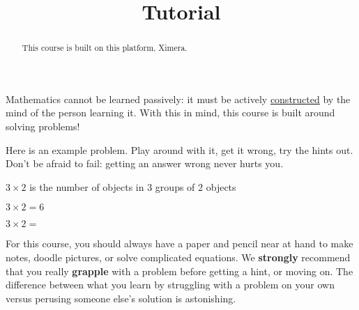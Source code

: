 \documentclass{ximera}
\title{Tutorial}
\begin{document}
\begin{abstract}
  This course is built on this platform, Ximera.
\end{abstract}\maketitle

Mathematics cannot be learned passively: it must be actively
\href{http://en.wikipedia.org/wiki/Constructivism_(philosophy_of_education)}{constructed}
by the mind of the person learning it.  With this in mind, this course
is built around solving problems!

Here is an example problem.  Play around with it, get it wrong, try
the hints out.  Don't be afraid to fail: getting an answer wrong never
hurts you.

\begin{question}
  \begin{solution}
    \begin{hint}
      $3 \times 2$ is the number of objects in $3$ groups of $2$ objects
    \end{hint}
    \begin{hint}
    \end{hint}
    \begin{hint}
      $3\times 2=6$
    \end{hint}
    $3\times 2 = $ 
  \end{solution}
\end{question}

For this course, you should always have a paper and pencil near at hand to make notes, doodle pictures, or solve complicated equations.
We \textbf{strongly} recommend that you really \textbf{grapple} with a problem before getting a hint, or moving on.  
The difference between what you learn by struggling with a problem on your own versus perusing someone else's solution is astonishing.
\end{document}
